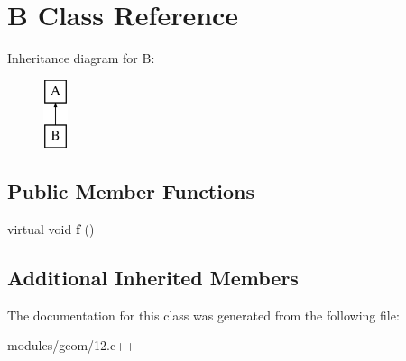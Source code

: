 \hypertarget{classB}{\section{B Class Reference}
\label{classB}
}
Inheritance diagram for B\-:\begin{figure}[H]
\begin{center}
\leavevmode
\includegraphics[height=2.000000cm]{classB}
\end{center}
\end{figure}
\subsection*{Public Member Functions}
\begin{DoxyCompactItemize}
\item 
\hypertarget{classB_a5c163abe1e7a9e4c509e11e536e25323}{virtual void {\bfseries f} ()}\label{classB_a5c163abe1e7a9e4c509e11e536e25323}

\end{DoxyCompactItemize}
\subsection*{Additional Inherited Members}


The documentation for this class was generated from the following file\-:\begin{DoxyCompactItemize}
\item 
modules/geom/12.\-c++\end{DoxyCompactItemize}
